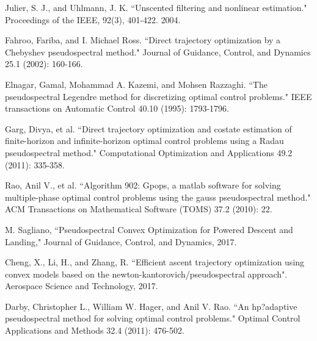 \documentclass[10pt,a4paper]{article}
\begin{document}
\begin{thebibliography}{1}
		Julier, S. J., and Uhlmann, J. K. ``Unscented filtering and nonlinear estimation." Proceedings of the IEEE, 92(3), 401-422. 2004.
				
		Fahroo, Fariba, and I. Michael Ross. ``Direct trajectory optimization by a Chebyshev pseudospectral method." Journal of Guidance, Control, and Dynamics 25.1 (2002): 160-166.
		
		Elnagar, Gamal, Mohammad A. Kazemi, and Mohsen Razzaghi. ``The pseudospectral Legendre method for discretizing optimal control problems." IEEE transactions on Automatic Control 40.10 (1995): 1793-1796.
		
		Garg, Divya, et al. ``Direct trajectory optimization and costate estimation of finite-horizon and infinite-horizon optimal control problems using a Radau pseudospectral method." Computational Optimization and Applications 49.2 (2011): 335-358.
		
		Rao, Anil V., et al. ``Algorithm 902: Gpops, a matlab software for solving multiple-phase optimal control problems using the gauss pseudospectral method." ACM Transactions on Mathematical Software (TOMS) 37.2 (2010): 22.				
				
				
				
		M. Sagliano, ``Pseudospectral Convex Optimization for Powered Descent and Landing," Journal of Guidance, Control, and Dynamics, 2017.
		
		Cheng, X., Li, H., and Zhang, R. ``Efficient ascent trajectory optimization using convex models based on the newton-kantorovich/pseudospectral approach". Aerospace Science and Technology, 2017.
		
		Darby, Christopher L., William W. Hager, and Anil V. Rao. ``An hp?adaptive pseudospectral method for solving optimal control problems." Optimal Control Applications and Methods 32.4 (2011): 476-502.
		
		
	\end{thebibliography}
\end{document}
